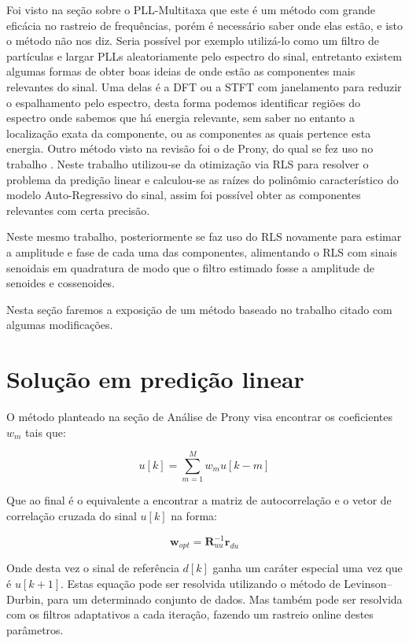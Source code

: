 Foi visto na seção sobre o PLL-Multitaxa que este é um método com grande eficácia no rastreio de frequências, porém é necessário saber onde elas estão, e isto o método não nos diz. Seria possível por exemplo utilizá-lo como um filtro de partículas e largar PLLs aleatoriamente pelo espectro do sinal, entretanto existem algumas formas de obter boas ideias de onde estão as componentes mais relevantes do sinal. Uma delas é a DFT ou a STFT com janelamento para reduzir o espalhamento pelo espectro, desta forma podemos identificar regiões do espectro onde sabemos que há energia relevante, sem saber no entanto a localização exata da componente, ou as componentes as quais pertence esta energia. Outro método visto na revisão foi o de Prony, do qual se fez uso no trabalho \cite{chang2009two}. Neste trabalho utilizou-se da otimização via RLS para resolver o problema da predição linear e calculou-se as raízes do polinômio característico do modelo Auto-Regressivo do sinal, assim foi possível obter as componentes relevantes com certa precisão.

\indent Neste mesmo trabalho, posteriormente se faz uso do RLS novamente para estimar a amplitude e fase de cada uma das componentes, alimentando o RLS com sinais senoidais em quadratura de modo que o filtro estimado fosse a amplitude de senoides e cossenoides.

\indent Nesta seção faremos a exposição de um método baseado no trabalho citado com algumas modificações.

\section{Solução em predição linear}

O método planteado na seção de Análise de Prony visa encontrar os coeficientes $w_m$ tais que:

\begin{equation}
u[k]=\sum_{m=1}^{M}w_m u[k-m]
\end{equation}

Que ao final é o equivalente a encontrar a matriz de autocorrelação e o vetor de correlação cruzada do sinal $u[k]$ na forma:

\begin{equation}
\boldsymbol{w}_{opt}=\boldsymbol{R}_{uu}^{-1}\boldsymbol{r}_{du}
\end{equation}

Onde desta vez o sinal de referência $d[k]$ ganha um caráter especial uma vez que é $u[k+1]$. Estas equação pode ser resolvida utilizando o método de Levinson–Durbin, para um determinado conjunto de dados. Mas também pode ser resolvida com os filtros adaptativos a cada iteração, fazendo um rastreio online destes parâmetros.

